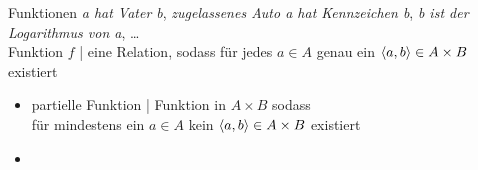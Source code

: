 \begin{frame}
  {Funktionen}
  \onslide<+->
  \onslide<+->
  \textit{a hat Vater b}, \textit{zugelassenes Auto a hat Kennzeichen b}, \textit{b ist der Logarithmus von a}, \ldots\\
  \Halbzeile
  \onslide<+->
  Funktion $f$ | eine Relation, sodass \alert{für jedes $a\in A$ genau ein $\langle{}a,b\rangle\in A\times B$ existiert}\\
  \Zeile
  \begin{itemize}[<+->]
    \item partielle Funktion | Funktion in $A\times B$ sodass\\
      für mindestens ein $a\in A$ kein $\langle{}a,b\rangle\in A\times B$ existiert
    \item {}
  \end{itemize}
\end{frame}


